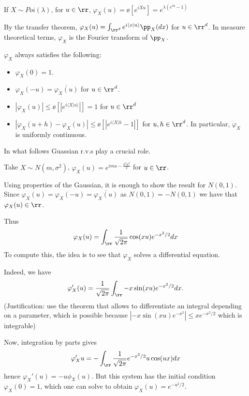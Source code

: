 \documentclass[../main.tex]{subfiles}
\begin{document}
\begin{example}
  If $X \sim Poi(\lambda)$, for $u \in \rr$, $\varphi_X(u) = \ee[e^{iXu}] =
  e^{\lambda(e^{iu} - 1)}$
\end{example}

\begin{remark}
  By the transfer theorem, $\varphi_X(u) = \int_{\rr^d} e^{i \langle x | u
  \rangle} \pp_X(dx)$ for $u \in \rr^d$. In measure theoretical terms,
  $\varphi_X$ is the Fourier transform of $\pp_X$.
\end{remark}

\begin{proposition}
    $\varphi_X$ always satisfies the following:
    \begin{itemize}
      \item $\varphi_X(0) = 1$.
      \item $\varphi_X(-u) = \overline{\varphi_X(u)}$ for $u \in \rr^d$.
      \item $|\varphi_X(u)| \leq \ee[|e^{i \langle X | u \rangle}|] = 1$ for
        $u \in \rr^d$
      \item $|\varphi_X(u + h) - \varphi_X(u)| \leq \ee[ |e^{i \langle X | h} -
        1|]$ for $u, h \in \rr^d$. In particular, $\varphi_X$ is uniformly
        continuous.
    \end{itemize}
\end{proposition}

In what follows Guassian r.v.s play a crucial role.
\begin{example}
  Take $X \sim N (m, \sigma^2)$, $\varphi_X(u) = e^{imu - \frac{\sigma^2u^2}{2}
  }$ for $u \in \rr$.
\end{example}
\begin{sketch}
  Using properties of the Gaussian, it is enough to show the result for $N(0,
  1)$. Since $\varphi_X(u) = \varphi_X(-u) = \overline{\varphi_X(u)}$ as $N(0,1) = -N(0,1)$
  we have that $\varphi_X(u) \in \rr$. 

  Thus $$\varphi_X(u) = \int_{\rr} \frac{1}{\sqrt{2\pi}} \cos(xu)
  e^{-x^2/2} dx$$ To compute this, the idea is to see that $\varphi_X$ solves a
  differential equation.
  
  Indeed, we have 
  \[
    \varphi_X'(u) = \frac{1}{\sqrt{2\pi}} \int_{\rr} -x \sin(xu)e^{-x^2 /
    2}dx.
  \] (Justification: use the theorem that allows to differentiate an integral
  depending on a parameter, which is possible because $|-x\sin(xu) e^{-x^2}|
  \leq x e^{-x^2/2}$ which is integrable)

  Now, integration by parts gives
  \[
    \varphi_X'{u} = -\int_{\rr} \frac{1}{\sqrt{2\pi}} e^{-x^2/2} u \cos(ux)dx
  \]
  hence $\varphi_X'(u) = -u \phi_X(u)$. But this system has the initial
  condition $\varphi_X(0) = 1$, which one can solve to obtain $\varphi_X(u) =
  e^{-u^2/2}$.
\end{sketch}
\end{document}
